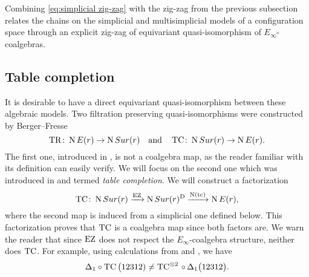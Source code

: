Combining \eqref{eq:simplicial zig-zag} with the zig-zag from the previous subsection relates the chains on the simplicial and multisimplicial models of a configuration space through an explicit zig-zag of equivariant quasi-isomorphism of $E_\infty$-coalgebras.

\subsection{Table completion}\label{ss:table completion}

It is desirable to have a direct equivariant quasi-isomorphism between these algebraic models.
Two filtration preserving quasi-isomorphisms were constructed by Berger--Fresse
\[
\operatorname{TR} \colon \operatorname{N}E(r) \to \operatorname{N}Sur(r)
\quad \text{and} \quad
\operatorname{TC} \colon \operatorname{N}Sur(r) \to \operatorname{N} E(r).
\]
The first one, introduced in \cite[1$\cdot$3]{berger2004combinatorial}, is not a coalgebra map, as the reader familiar with its definition can easily verify.
We will focus on the second one which was introduced in \cite{berger2002prismatic} and termed \textit{table completion}.
We will construct a factorization
\[
\operatorname{TC} \colon \operatorname{N}Sur(r) \xrightarrow{\operatorname{EZ}} \operatorname{N}Sur(r)^{\mathrm{D}} \xrightarrow{\operatorname{N}(\operatorname{tc})} \operatorname{N} E(r),
\]
where the second map is induced from a simplicial one defined below.
This factorization proves that $\operatorname{TC}$ is a coalgebra map since both factors are.
We warn the reader that since $\operatorname{EZ}$ does not respect the $E_\infty$-coalgebra structure,
neither does $\operatorname{TC}$.
For example, using calculations from \cite{medina2022cube_einfty} and \cite{berger2002prismatic}, we have
\[
\Delta_1 \circ \operatorname{TC}\big(12312) \neq
\operatorname{TC} ^{\otimes 2}\, \circ \, \Delta_1\big(12312\big).
\]

%

